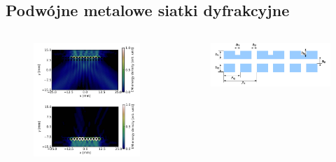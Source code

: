 \documentclass{beamer}
\begin{document}
\subsection{Podwójne metalowe siatki dyfrakcyjne}
\begin{frame}
	\begin{columns}
		\begin{column}{0.5\textwidth}
			\begin{figure}
				\includegraphics[width=\textwidth]{../images/dmg/letters_eneden.png}
			\end{figure}
		\end{column}
		\begin{column}{0.5\textwidth}
			\begin{figure}
				\includegraphics[width=\textwidth]{../images/dmg/letters_schemat.png}
			\end{figure}
		\end{column}
	\end{columns}
		
\end{frame}
\end{document}
